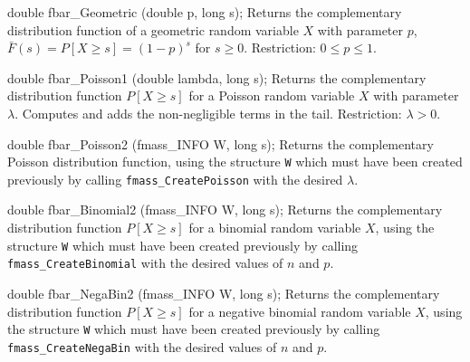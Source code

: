 
\code

double fbar_Geometric (double p, long s);
\endcode
  \tab Returns the complementary distribution function of 
   a geometric random variable $X$ with parameter $p$, 
   $\bar F(s) = P[X\ge s] = (1-p)^s$ 
   for $s\ge 0$.
  Restriction: $0 \le p \le 1$.
 \endtab
\code


double fbar_Poisson1 (double lambda, long s);
\endcode
  \tab  Returns the complementary distribution function $P[X\ge s]$
   for a Poisson random variable $X$ with parameter $\lambda$.
   Computes and adds the non-negligible terms in the tail.
   Restriction: $\lambda > 0$.
 \endtab
\code


double fbar_Poisson2 (fmass_INFO W, long s);
\endcode
 \tab  Returns the complementary Poisson distribution function,
  using the structure {\tt W} which must have been created previously
  by calling {\tt fmass\_CreatePoisson} with the desired $\lambda$.
 \endtab
\code


double fbar_Binomial2 (fmass_INFO W, long s);
\endcode
  \tab  Returns the complementary distribution function $P[X\ge s]$
  for a binomial random variable $X$,
  using the structure {\tt W} which must have been created previously
  by calling {\tt fmass\_CreateBinomial} with the desired values of
  $n$ and $p$.
 \endtab
\code


double fbar_NegaBin2 (fmass_INFO W, long s);
\endcode
  \tab  Returns the complementary distribution function $P[X\ge s]$
  for a negative binomial random variable $X$,
  using the structure {\tt W}
  which must have been created previously
  by calling {\tt fmass\_CreateNegaBin} with the desired values of
  $n$ and $p$.
 \endtab
\code


